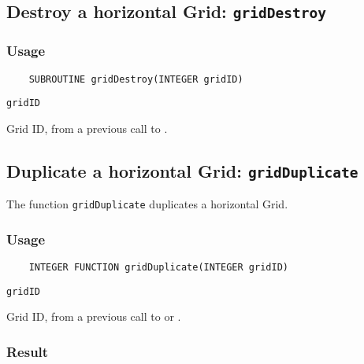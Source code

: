 \subsection{Destroy a horizontal Grid: {\tt gridDestroy}}
\label{gridDestroy}
\subsubsection*{Usage}

\begin{verbatim}
    SUBROUTINE gridDestroy(INTEGER gridID)
\end{verbatim}

\hspace*{4mm}\begin{minipage}[]{15cm}
\begin{deflist}{\tt gridID\ }
\item[{\tt gridID}]
Grid ID, from a previous call to {}.

\end{deflist}
\end{minipage}


\subsection{Duplicate a horizontal Grid: {\tt gridDuplicate}}
\label{gridDuplicate}

The function {\tt gridDuplicate} duplicates a horizontal Grid.

\subsubsection*{Usage}

\begin{verbatim}
    INTEGER FUNCTION gridDuplicate(INTEGER gridID)
\end{verbatim}

\hspace*{4mm}\begin{minipage}[]{15cm}
\begin{deflist}{\tt gridID\ }
\item[{\tt gridID}]
Grid ID, from a previous call to {} or {}.

\end{deflist}
\end{minipage}

\subsubsection*{Result}

